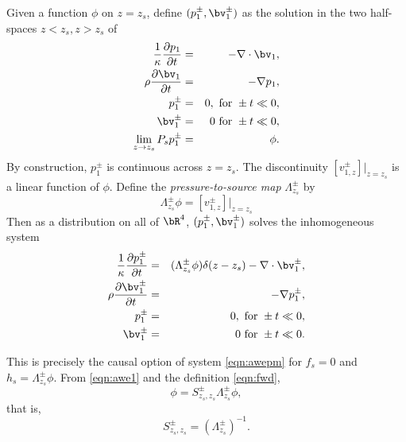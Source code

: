 Given a function $\phi$ on $z=z_s$, define $(p^{\pm}_1,\bv^{\pm}_1)$
as the solution in the two half-spaces $z <z_s, z>z_s$ of
\begin{eqnarray}
\label{eqn:awe1}
  \frac{1}{\kappa}\frac{\partial p_1}{\partial t} & = & - \nabla \cdot \bv_1, \nonumber \\
  \rho\frac{\partial \bv_1}{\partial t} & = & - \nabla p_1,\nonumber \\
  p^{\pm}_1 & =& 0,  \mbox{ for } \pm t \ll 0,\nonumber\\ 
  \bv^{\pm}_1 & = & 0 \mbox{ for } \pm t \ll 0,\nonumber\\
  \lim_{z \rightarrow z_s} P_sp^{\pm}_1& =& \phi.
\end{eqnarray}
By construction, $p^{\pm}_1$ is continuous across $z=z_s$. The
discontinuity $[v^{\pm}_{1,z}]|_{z=z_s}$ is a linear function of
$\phi$. Define the {\em pressure-to-source map} $\Lambda^{\pm}_{z_s}$ by
\begin{equation}
  \label{eqn:deflam}
  \Lambda^{\pm}_{z_s}\phi = [v^{\pm}_{1,z}]|_{z=z_s}
\end{equation}
Then as a distribution on all of $\bR^4$, $(p^{\pm}_1,\bv^{\pm}_1)$ solves the
inhomogeneous system
\begin{eqnarray}
\label{eqn:sawe1}
  \frac{1}{\kappa}\frac{\partial p^{\pm}_1}{\partial t} & = &
                                                        (\Lambda^{\pm}_{z_s}\phi)\delta(z-z_s) - \nabla \cdot \bv^{\pm}_1, \nonumber \\
  \rho\frac{\partial \bv^{\pm}_1}{\partial t} & = & - \nabla p^{\pm}_1,\nonumber \\
  p^{\pm}_1 & =& 0,  \mbox{ for } \pm t \ll 0,\nonumber\\ 
  \bv^{\pm}_1 & = & 0 \mbox{ for } \pm t \ll 0.
\end{eqnarray}

This is precisely the causal option of system \ref{eqn:awepm} for
$f_s=0$ and $h_s=\Lambda^{\pm}_{z_s}\phi$. From \ref{eqn:awe1} and the definition
\ref{eqn:fwd},
\begin{equation}
  \label{eqn:lamfwd}
  \phi = S^{\pm}_{z_s,z_s}\Lambda^{\pm}_{z_s}\phi,
\end{equation}
that is,
\begin{equation}
  \label{eqn:lamfwd1}
  S^{\pm}_{z_s,z_s} = (\Lambda^{\pm}_{z_s})^{-1}.
\end{equation}

